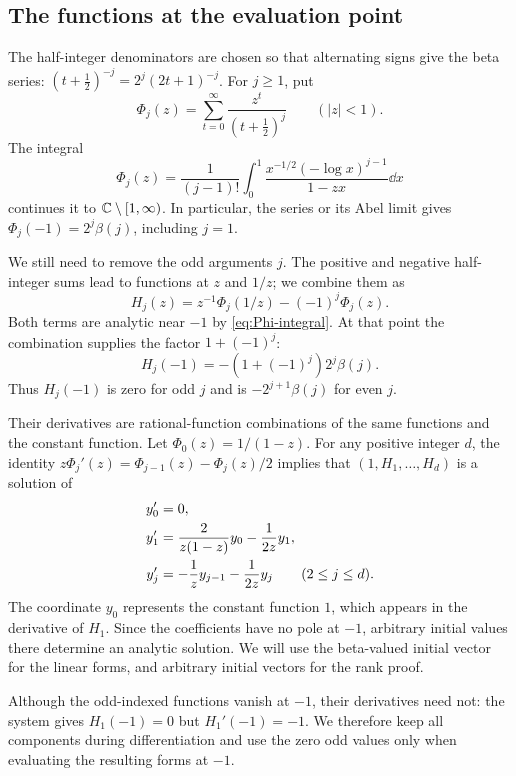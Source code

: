 \subsection{The functions at the evaluation point}

The half-integer denominators are chosen so that alternating signs give
the beta series: $(t+\tfrac12)^{-j}=2^j(2t+1)^{-j}$.
For $j\geq1$, put
\[
 \Phi_j(z)=\sum_{t=0}^{\infty}\frac{z^t}{(t+\tfrac12)^j}
 \qquad(|z|<1).
\]
The integral
\begin{equation}\label{eq:Phi-integral}
 \Phi_j(z)=\frac1{(j-1)!}\int_0^1
       \frac{x^{-1/2}(-\log x)^{j-1}}{1-zx}\dd x
\end{equation}
continues it to $\mathbb C\setminus[1,\infty)$.
In particular, the series or its Abel limit gives
$\Phi_j(-1)=2^j\beta(j)$, including $j=1$.

We still need to remove the odd arguments $j$. The positive and negative
half-integer sums lead to functions at $z$ and $1/z$; we combine them as
\[
 H_j(z)=z^{-1}\Phi_j(1/z)-(-1)^j\Phi_j(z).
\]
Both terms are analytic near $-1$ by \eqref{eq:Phi-integral}.
At that point the combination supplies the factor $1+(-1)^j$:
\begin{equation}\label{eq:H-values}
 H_j(-1)=-(1+(-1)^j)2^j\beta(j).
\end{equation}
Thus $H_j(-1)$ is zero for odd $j$ and is $-2^{j+1}\beta(j)$ for even $j$.

Their derivatives are rational-function combinations of the same
functions and the constant function. Let $\Phi_0(z)=1/(1-z)$.
For any positive integer $d$, the identity
$z\Phi_j'(z)=\Phi_{j-1}(z)-\Phi_j(z)/2$ implies that
$(1,H_1,\ldots,H_d)$ is a solution of
\begin{align}
 y_0'&=0,\notag\\
 y_1'&=\frac{2}{z(1-z)}y_0-\frac1{2z}y_1,\label{eq:base-system}\\
 y_j'&=-\frac1z y_{j-1}-\frac1{2z}y_j \qquad(2\leq j\leq d).\notag
\end{align}
The coordinate $y_0$ represents the constant function $1$, which appears
in the derivative of $H_1$. Since the coefficients have no pole at $-1$,
arbitrary initial values there determine an analytic solution. We will
use the beta-valued initial vector for the linear forms, and arbitrary
initial vectors for the rank proof.

Although the odd-indexed functions vanish at $-1$, their derivatives
need not: the system gives $H_1(-1)=0$ but $H_1'(-1)=-1$.
We therefore keep all components during differentiation and use the
zero odd values only when evaluating the resulting forms at $-1$.

